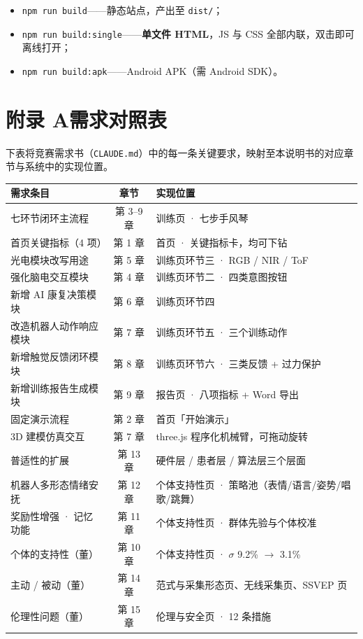\documentclass[11pt, a4paper]{ctexart}
\begin{document}
\begin{itemize}[itemsep=3pt, topsep=4pt]
  \item \texttt{npm run build}——静态站点，产出至 \texttt{dist/}；
  \item \texttt{npm run build:single}——\textbf{单文件 HTML}，JS 与 CSS 全部内联，双击即可离线打开；
  \item \texttt{npm run build:apk}——Android APK（需 Android SDK）。
\end{itemize}

\newpage
\appendix
\section*{附录 A\quad 需求对照表}

下表将竞赛需求书（\texttt{CLAUDE.md}）中的每一条关键要求，映射至本说明书的对应章节与系统中的实现位置。

\begin{longtable}{@{}p{} c p{}@{}}
\toprule
\sffamily\bfseries 需求条目 & \sffamily\bfseries 章节 & \sffamily\bfseries 实现位置 \\
\midrule
\endhead
七环节闭环主流程       & 第 3--9 章 & 训练页 · 七步手风琴 \\
首页关键指标（4 项）   & 第 1 章    & 首页 · 关键指标卡，均可下钻 \\
光电模块改写用途       & 第 5 章    & 训练页环节三 · RGB / NIR / ToF \\
强化脑电交互模块       & 第 4 章    & 训练页环节二 · 四类意图按钮 \\
新增 AI 康复决策模块   & 第 6 章    & 训练页环节四 \\
改造机器人动作响应模块 & 第 7 章    & 训练页环节五 · 三个训练动作 \\
新增触觉反馈闭环模块   & 第 8 章    & 训练页环节六 · 三类反馈 + 过力保护 \\
新增训练报告生成模块   & 第 9 章    & 报告页 · 八项指标 + Word 导出 \\
固定演示流程           & 第 2 章    & 首页「开始演示」\\
3D 建模仿真交互        & 第 7 章    & three.js 程序化机械臂，可拖动旋转 \\
\midrule
普适性的扩展           & 第 13 章   & 硬件层 / 患者层 / 算法层三个层面 \\
机器人多形态情绪安抚   & 第 12 章   & 个体支持性页 · 策略池（表情/语言/姿势/唱歌/跳舞）\\
奖励性增强 · 记忆功能  & 第 11 章   & 个体支持性页 · 群体先验与个体校准 \\
\midrule
个体的支持性（董）     & 第 10 章   & 个体支持性页 · $\sigma$ 9.2\% $\to$ 3.1\% \\
主动 / 被动（董）      & 第 14 章   & 范式与采集形态页、无线采集页、SSVEP 页 \\
伦理性问题（董）       & 第 15 章   & 伦理与安全页 · 12 条措施 \\
\bottomrule
\end{longtable}
\end{document}
